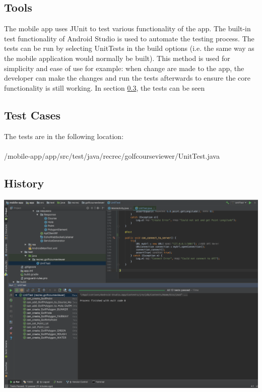 \documentclass{article}
\begin{document}
    \subsection{Tools}
    \label{sec:ma-tools}

    The mobile app uses JUnit to test various functionality of the app. The built-in test  functionality of Android Studio is used to automate the testing process. The tests can be run by selecting UnitTests in the build options (i.e. the same way as the mobile application would normally be built). This method is used for simplicity and ease of use for example: when change are made to the app, the developer can make the changes and run the tests afterwards to ensure the core functionality is still working. In section \ref{sec:ma-hist}, the tests can be seen

    \subsection{Test Cases}
    \label{sec:ma-cases}

    The tests are in the following location:
    \\
    \\
  	/mobile-app/app/src/test/java/recrec/golfcourseviewer/UnitTest.java

    \subsection{History}
    \label{sec:ma-hist}

    \includegraphics[scale=0.35]{AppTest}
\end{document}
